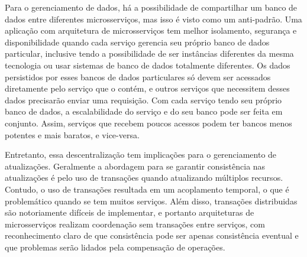 Para o gerenciamento de dados, há a possibilidade de compartilhar um banco de dados entre diferentes microsserviços, mas isso é visto como um anti-padrão. Uma aplicação com arquitetura de microsserviços tem melhor isolamento, segurança e disponibilidade quando cada serviço gerencia seu próprio banco de dados particular, inclusive tendo a possibilidade de ser instâncias diferentes da mesma tecnologia ou usar sistemas de banco de dados totalmente diferentes. Os dados persistidos por esses bancos de dados particulares só devem ser acessados diretamente pelo serviço que o contém, e outros serviços que necessitem desses dados precisarão enviar uma requisição. Com cada serviço tendo seu próprio banco de dados, a escalabilidade do serviço e do seu banco pode ser feita em conjunto. Assim, serviços que recebem poucos acessos podem ter bancos menos potentes e mais baratos, e vice-versa. \cite{oracle_microservices,MartinFowlerMicroservices}

Entretanto, essa descentralização tem implicações para o gerenciamento de atualizações. Geralmente a abordagem para se garantir consistência nas atualizações é pelo uso de transações quando atualizando múltiplos recursos. Contudo, o uso de transações resultada em um acoplamento temporal, o que é problemático quando se tem muitos serviços. Além disso, transações distribuidas são notoriamente difíceis de implementar, e portanto arquiteturas de microsserviços realizam coordenação sem transações entre serviços, com reconhecimento claro de que consistência pode ser apenas consistência eventual e que problemas serão lidados pela compensação de operações. \cite{MartinFowlerMicroservices} 



    


